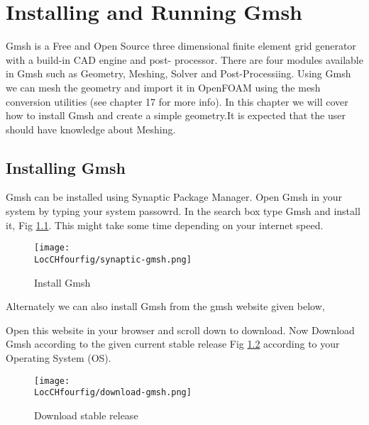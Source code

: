 \chapter{Installing and Running Gmsh}
\thispagestyle{empty}
\label{sec:chap4}
\newcommand{\LocCHfourfig}{\Origin/CHAPTERS/chap4/figures}

Gmsh is a Free and Open Source three dimensional finite element grid generator with a build-in CAD engine and post-
processor. There are four modules available in Gmsh such as Geometry, Meshing, Solver and Post-Processiing. Using
Gmsh we can mesh the geometry and import it in OpenFOAM using the mesh conversion utilities (see chapter 17 for more info).
In this chapter we will cover how to install Gmsh and create a simple geometry.It is expected that the user should have knowledge 
about Meshing.

\section{Installing Gmsh}

Gmsh can be installed using Synaptic Package Manager. Open Gmsh in your system by typing your system passowrd.
In the search box type Gmsh and install it, Fig \ref{synaptic-gmsh}. This might take some time depending on your internet speed.

\begin{figure}[ht]  
\begin{center}  
\texttt{[image: \\LocCHfourfig/synaptic-gmsh.png]}
\caption{Install Gmsh}
\label{synaptic-gmsh}
\end{center}  
\end{figure}


\flushleft Alternately we can also install Gmsh from the gmsh website given below,

 \newline

\flushleft Open this website in your browser and scroll down to download. Now Download Gmsh according to the given current stable release 
Fig \ref{download-gmsh} according to your Operating System (OS).

\begin{figure}[ht]  
\begin{center}  
\texttt{[image: \\LocCHfourfig/download-gmsh.png]}
\caption{Download stable release}
\label{download-gmsh}
\end{center}  
\end{figure}

